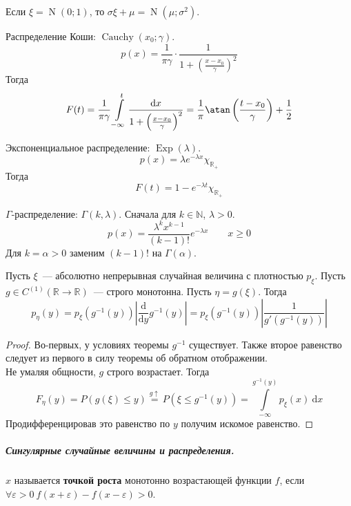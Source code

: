 \documentclass{article}
\let\eps\varepsilon
\begin{document}
    \begin{corollary}
        Если $\xi=\operatorname{N}(0;1)$, то $\sigma\xi+\mu=\operatorname{N}(\mu;\sigma^2)$.
    \end{corollary}
    \begin{example}
        Распределение Коши: $\operatorname{Cauchy}(x_0;\gamma)$.
        $$
        p(x)=\frac1{\pi\gamma}\cdot\frac1{1+\left(\frac{x-x_0}\gamma\right)^2}
        $$
        Тогда
        $$
        F(t)=\frac1{\pi\gamma}\int\limits_{-\infty}^t\frac{\mathrm dx}{1+\left(\frac{x-x_0}\gamma\right)^2}=\frac1\pi\atan\left(\frac{t-x_0}\gamma\right)+\frac12
        $$
    \end{example}
    \begin{example}
        Экспоненциальное распределение: $\operatorname{Exp}(\lambda)$.
        $$
        p(x)=\lambda e^{-\lambda x}\chi_{\mathbb R_+}
        $$
        Тогда
        $$
        F(t)=1-e^{-\lambda t}\chi_{\mathbb R_+}
        $$
    \end{example}
    \begin{example}
        $\Gamma$-распределение: $\Gamma(k,\lambda)$. Сначала для $k\in\mathbb N$, $\lambda>0$.
        $$
        p(x)=\frac{\lambda^kx^{k-1}}{(k-1)!}e^{-\lambda x}\qquad x\geqslant 0
        $$
        Для $k=\alpha>0$ заменим $(k-1)!$ на $\Gamma(\alpha)$.
    \end{example}
    \begin{claim}
        Пусть $\xi$~--- абсолютно непрерывная случайная величина с плотностью $p_\xi$. Пусть $g\in C^{(1)}(\mathbb R\to\mathbb R)$~--- строго монотонна. Пусть $\eta=g(\xi)$. Тогда
        $$
        p_\eta(y)=p_\xi(g^{-1}(y))\left|\frac{\mathrm d}{\mathrm dy}g^{-1}(y)\right|=p_\xi(g^{-1}(y))\left|\frac1{g'(g^{-1}(y))}\right|
        $$
    \end{claim}
    \begin{proof}
        Во-первых, у условиях теоремы $g^{-1}$ существует. Также второе равенство следует из первого в силу теоремы об обратном отображении.\\
        Не умаляя общности, $g$ строго возрастает. Тогда
        $$
        F_\eta(y)=P(g(\xi)\leqslant y)\overset{g\uparrow}=P(\xi\leqslant g^{-1}(y))=\int\limits_{-\infty}^{g^{-1}(y)}p_\xi(x)~\mathrm dx
        $$
        Продифференцировав это равенство по $y$ получим искомое равенство.
    \end{proof}
    \subparagraph{Сингулярные случайные величины и распределения.}
    \begin{definition}
        $x$ называется \textbf{точкой роста} монотонно возрастающей функции $f$, если $\forall\eps>0~f(x+\eps)-f(x-\eps)>0$.
    \end{definition}
\end{document}
